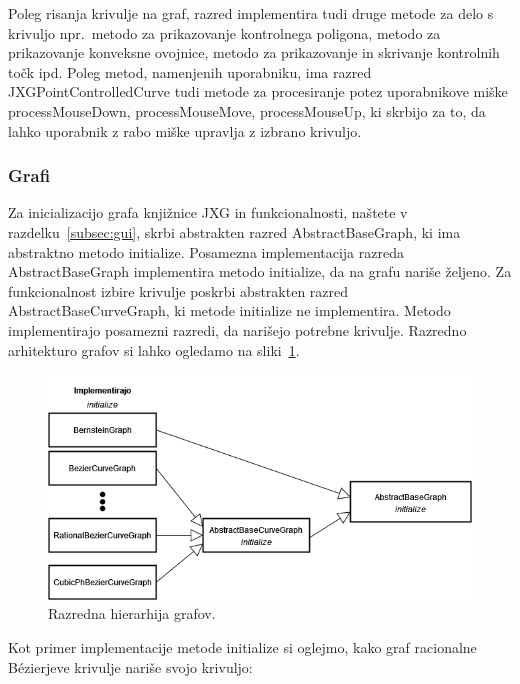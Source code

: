 \documentclass[isrm2, tisk]{fmfdelo}
\begin{document}
    Poleg risanja krivulje na graf, razred implementira tudi druge metode za delo s krivuljo npr.\ metodo za prikazovanje kontrolnega poligona, metodo za prikazovanje konveksne ovojnice, metodo za prikazovanje in skrivanje kontrolnih točk ipd.
    Poleg metod, namenjenih uporabniku, ima razred JXGPointControlledCurve tudi metode za procesiranje potez uporabnikove miške processMouseDown, processMouseMove, processMouseUp, ki skrbijo za to, da lahko uporabnik z rabo miške upravlja z izbrano krivuljo.

    \subsubsection{Grafi}
    Za inicializacijo grafa knjižnice JXG in funkcionalnosti, naštete v razdelku~\ref{subsec:gui}, skrbi abstrakten razred AbstractBaseGraph, ki ima abstraktno metodo initialize.
    Posamezna implementacija razreda AbstractBaseGraph implementira metodo initialize, da na grafu nariše željeno.
    Za funkcionalnost izbire krivulje poskrbi abstrakten razred AbstractBaseCurveGraph, ki metode initialize ne implementira.
    Metodo implementirajo posamezni razredi, da narišejo potrebne krivulje.
    Razredno arhitekturo grafov si lahko ogledamo na sliki~\ref{fig:hiearhija-krivulj}.
    \begin{figure}[h!]
        \centering
        \includegraphics[width = \textwidth]{drawio/graph-hierarhija.drawio}
        \caption{Razredna hierarhija grafov.}
        \label{fig:hiearhija-krivulj}
    \end{figure}
    Kot primer implementacije metode initialize si oglejmo, kako graf racionalne Bézierjeve krivulje nariše svojo krivuljo:
\end{document}

